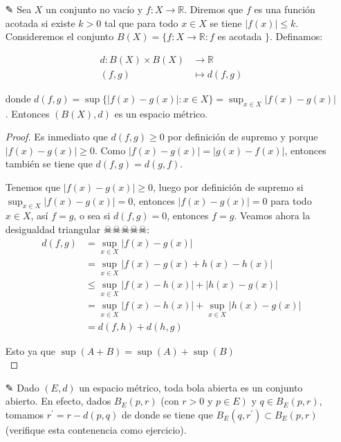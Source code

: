 \begin{itemize}[leftmargin=*]
\begin{proof}
    \end{proof}

 

    \item[✎]Sea $X$ un conjunto no vacío y $f: X \rightarrow \mathbb{R}$. Diremos que $f$ es una función acotada si existe $k>0$ tal que para todo $x \in X$ se tiene $|f(x)| \leq k$. Consideremos el conjunto $B(X)=\{f: X \rightarrow \mathbb{R}: f$ es acotada $\}$. Definamos:

        $$
        \begin{aligned}
        d: B(X) \times B(X) & \rightarrow \mathbb{R} \\
        (f, g) & \mapsto d(f, g)
        \end{aligned}
        $$

        donde $d(f, g)=\sup \{|f(x)-g(x)|: x \in X\}=\sup _{x \in X}|f(x)-g(x)|$. Entonces $(B(X), d)$ es un espacio métrico.\\

        \begin{proof}
            Es inmediato que $d(f,g)\geq 0$ por definición de supremo y porque $|f(x)-g(x)|\geq 0$. Como $|f(x)-g(x)|=|g(x)-f(x)|$, entonces también se tiene que $d(f,g)=d(g,f)$.

            Tenemos que $|f(x)-g(x)|\geq 0$, luego por definición de supremo si $\sup_{x \in X}|f(x)-g(x)|=0$, entonces $|f(x)-g(x)|=0$ para todo $x\in X$, así $f=g$, o sea si $d(f,g)=0$, entonces $f=g$. Veamos ahora la desigualdad triangular ☠☠☠☠☠:
            \begin{align*}
                d(f,g)&=\sup_{x\in X}|f(x)-g(x)|\\
                &=\sup_{x\in X}|f(x)-g(x)+h(x)-h(x)|\\
                &\leq \sup_{x\in X}|f(x)-h(x)|+|h(x)-g(x)|\\
                &=\sup_{x\in X}|f(x)-h(x)|+\sup_{x\in X}|h(x)-g(x)|\\
                &=d(f,h)+d(h,g)
            \end{align*}

            Esto ya que $\sup (A+B)=\sup(A)+\sup (B)$\\
            
        \end{proof}

        \item[✎] Dado $(E, d)$ un espacio métrico, toda bola abierta es un conjunto abierto. En efecto, dados $B_E(p, r)$ (con $r>0$ y $\left.p \in E\right)$ y $q \in B_E(p, r)$, tomamos $r^{\prime}=r-d(p, q)$ de donde se tiene que $B_E\left(q, r^{\prime}\right) \subset B_E(p, r)$ (verifique esta contenencia como ejercicio).


\end{itemize}
